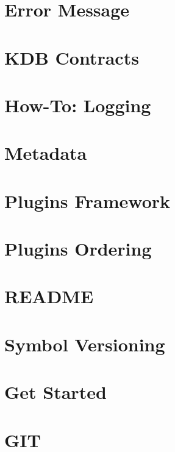\documentclass[twoside]{book}
\newcommand{\+}{\discretionary{\mbox{\scriptsize$\hookleftarrow$}}{}{}}
\begin{document}
\chapter{Error Message}
\label{doc_dev_error-message_md}

\chapter{K\+DB Contracts}
\label{doc_dev_kdb-contracts_md}

\chapter{How-\/\+To\+: Logging}
\label{doc_dev_logging_md}

\chapter{Metadata}
\label{doc_dev_metadata_md}

\chapter{Plugins Framework}
\label{doc_dev_plugins-framework_md}

\chapter{Plugins Ordering}
\label{doc_dev_plugins-ordering_md}

\chapter{R\+E\+A\+D\+ME}
\label{md_doc_dev_README}

\chapter{Symbol Versioning}
\label{doc_dev_symbol-versioning_md}

\chapter{Get Started}
\label{doc_GETSTARTED_md}

\chapter{G\+IT}
\label{doc_GIT_md}

\end{document}
